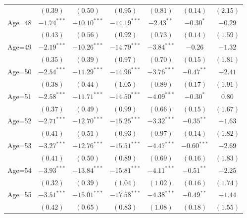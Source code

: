 \documentclass[fullpage]{paper}
\begin{document}
\begin{center}
\begin{longtable}{l c c c c c c }
            & $(0.39)$      & $(0.50)$       & $(0.95)$       & $(0.81)$       & $(0.14)$      & $(2.15)$      \\
Age=48      & $-1.74^{***}$ & $-10.10^{***}$ & $-14.19^{***}$ & $-2.43^{**}$   & $-0.30^{*}$   & $-0.29$       \\
            & $(0.43)$      & $(0.56)$       & $(0.92)$       & $(0.73)$       & $(0.14)$      & $(1.59)$      \\
Age=49      & $-2.19^{***}$ & $-10.26^{***}$ & $-14.79^{***}$ & $-3.84^{***}$  & $-0.26$       & $-1.32$       \\
            & $(0.35)$      & $(0.39)$       & $(0.97)$       & $(0.70)$       & $(0.15)$      & $(1.81)$      \\
Age=50      & $-2.54^{***}$ & $-11.29^{***}$ & $-14.96^{***}$ & $-3.76^{***}$  & $-0.47^{**}$  & $-2.41$       \\
            & $(0.38)$      & $(0.44)$       & $(1.05)$       & $(0.89)$       & $(0.17)$      & $(1.91)$      \\
Age=51      & $-2.58^{***}$ & $-11.71^{***}$ & $-14.50^{***}$ & $-4.09^{***}$  & $-0.30^{*}$   & $0.80$        \\
            & $(0.37)$      & $(0.49)$       & $(0.99)$       & $(0.66)$       & $(0.15)$      & $(1.67)$      \\
Age=52      & $-2.71^{***}$ & $-12.70^{***}$ & $-15.25^{***}$ & $-3.32^{***}$  & $-0.35^{**}$  & $-1.63$       \\
            & $(0.41)$      & $(0.51)$       & $(0.93)$       & $(0.97)$       & $(0.14)$      & $(1.82)$      \\
Age=53      & $-3.27^{***}$ & $-12.76^{***}$ & $-15.51^{***}$ & $-4.47^{***}$  & $-0.60^{***}$ & $-2.69$       \\
            & $(0.41)$      & $(0.50)$       & $(0.89)$       & $(0.69)$       & $(0.16)$      & $(1.83)$      \\
Age=54      & $-3.93^{***}$ & $-13.84^{***}$ & $-15.81^{***}$ & $-4.11^{***}$  & $-0.51^{**}$  & $-2.25$       \\
            & $(0.32)$      & $(0.39)$       & $(1.04)$       & $(1.02)$       & $(0.16)$      & $(1.74)$      \\
Age=55      & $-3.51^{***}$ & $-15.01^{***}$ & $-17.58^{***}$ & $-4.38^{***}$  & $-0.49^{**}$  & $-1.44$       \\
            & $(0.42)$      & $(0.65)$       & $(0.83)$       & $(1.08)$       & $(0.18)$      & $(1.55)$      \\

\end{longtable}
\end{center}
\end{document}

